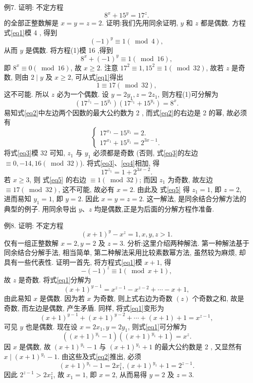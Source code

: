 例7. 证明: 不定方程
$$
8^x+15^y=17^z . \label{eq1}
$$
的全部正整数解是 $x=y=z=2$.
证明:我们先用同余证明, $y$ 和 $z$ 都是偶数.
方程式\ref{eq1}模 4 , 得到
$$
(-1)^y \equiv 1(\bmod 4),
$$
从而 $y$ 是偶数.
将方程(1)模 16 ,得到
$$
8^x+(-1)^y \equiv 1(\bmod 16),
$$
即 $8^x \equiv 0(\bmod 16)$, 故 $x \geqslant 2$.
注意 $17^2 \equiv 1,15^2 \equiv 1(\bmod 32)$, 故若 $z$ 是奇数, 则由 $2 \mid y$ 及 $x \geqslant 2$, 可从式\ref{eq1}得出
$$
1 \equiv 17(\bmod 32),
$$
这不可能.
所以 $z$ 必为一个偶数.
设 $y=2 y_1, z=2 z_1$, 则方程(1)可分解为
$$
\left(17^{z_1}-15^{y_1}\right)\left(17^{z_1}+15^{y_1}\right)=8^x . \label{eq2}
$$
易知式\ref{eq2}中左边两个因数的最大公约数为 2 , 而式\ref{eq2}的右边是 2 的幂, 故必须有
$$
\left\{\begin{array}{l}
17^{x_1}-15^{y_1}=2 . \label{eq3}\\
17^{x_1}+15^{y_1}=2^{3 x-1} . \label{eq4}
\end{array}\right.
$$
将式\ref{eq3}模 32 可知, $z_1$ 与 $y_1$ 必须都是奇数 (否则, 式\ref{eq3}的左边 $\equiv 0,-14,16(\bmod 32)$). 将式\ref{eq3}、\ref{eq4}相加, 得
$$
17^{z_1}=1+2^{3 x-2} . \label{eq5}
$$
若 $x \geqslant 3$, 则 式\ref{eq5} 的右边 $\equiv 1(\bmod 32)$; 而因 $z_1$ 为奇数, 故左边 $\equiv 17(\bmod 32)$, 这不可能, 故必有 $x=2$. 由此及 式\ref{eq5} 得 $z_1=1$, 即 $z=2$, 进而易知 $y_1=1$, 即 $y=2$. 因此 $x=y=z=2$.
这一解法, 是同余结合分解方法的典型的例子.
用同余导出 $y 、 z$ 均是偶数,正是为后面的分解方程作准备.



例8. 证明: 不定方程
$$
(x+1)^y-x^z=1, x, y, z>1 . \label{eq1}
$$
仅有一组正整数解 $x=2, y=2$ 及 $z=3$.
分析:这里介绍两种解法.
第一种解法基于同余结合分解手法, 相当简单, 第二种解法采用比较素数幂方法, 虽然较为麻烦, 却具有一些代表性.
证明一首先, 将方程式\ref{eq1}模 $x+1$, 得
$$
-(-1)^z \equiv 1(\bmod x+1),
$$
故 $z$ 是奇数.
将式\ref{eq1}分解为
$$
(x+1)^{y-1}=x^{z-1}-x^{z-2}+\cdots-x+1,
$$
由此易知 $x$ 是偶数.
因为若 $x$ 为奇数, 则上式右边为奇数 $(z)$ 个奇数之和, 故是奇数, 而左边是偶数, 产生矛盾.
同样, 将式\ref{eq1}变形为
$$
(x+1)^{y-1}+(x+1)^{y-2}+\cdots+(x+1)+1=x^{z-1},
$$
可见 $y$ 也是偶数.
现在设 $x=2 x_1, y=2 y_1$, 则式\ref{eq1}可分解为
$$
\left((x+1)^{y_1}-1\right)\left((x+1)^{y_1}+1\right)=x^z . \label{eq2}
$$
因 $x$ 是偶数, 故 $(x+1)^{y_1}-1$ 与 $(x+1)^{y_1}+1$ 的最大公约数是 2 , 又显然有 $x \mid(x+1)^{y_1}-1$. 由这些及式\ref{eq2}推出, 必须
$$
(x+1)^{y_1}-1=2 x_1^z,(x+1)^{y_1}+1=2^{z-1} .
$$
因此 $2^{z-1}>2 x_1^z$, 故 $x_1=1$, 即 $x=2$, 从而易得 $y=2$ 及 $z=3$.



